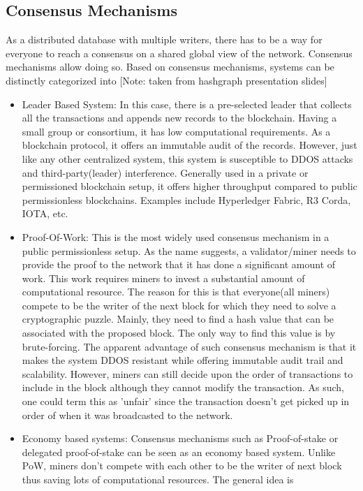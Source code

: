 \subsection{Consensus Mechanisms}
As a distributed database with multiple writers, there has to be a way for
everyone to reach a consensus on a shared global view of the network. Consensus
mechanisms allow doing so. Based on consensus mechanisms, systems can be
distinctly categorized into [Note: taken from hashgraph presentation slides]
\begin{itemize}
	\item Leader Based System: In this case, there is a pre-selected leader
		that collects all the transactions and appends new records to the
		blockchain.  Having a small group or consortium, it has low
		computational requirements. As a blockchain protocol, it offers an
		immutable audit of the records. However, just like any other
		centralized system, this system is susceptible to DDOS attacks and
		third-party(leader) interference. Generally used in a private or
		permissioned blockchain setup, it offers higher throughput compared to
		public permissionless blockchains. Examples include Hyperledger Fabric,
		R3 Corda, IOTA, etc. 
	\item Proof-Of-Work: This is the most widely used consensus mechanism in a
		public permissionless setup. As the name suggests, a validator/miner
		needs to provide the proof to the network that it has done a
		significant amount of work. This work requires miners to invest a
		substantial amount of computational resource. The reason for this is
		that everyone(all miners) compete to be the writer of the next block
		for which they need to solve a cryptographic puzzle. Mainly, they need
		to find a hash value that can be associated with the proposed block.
		The only way to find this value is by brute-forcing. The apparent
		advantage of such consensus mechanism is that it makes the system DDOS
		resistant while offering immutable audit trail and scalability.
		However, miners can still decide upon the order of transactions to
		include in the block although they cannot modify the transaction. As
		such, one could term this as 'unfair' since the transaction doesn't get
		picked up in order of when it was broadcasted to the network. 
	\item Economy based systems: Consensus mechanisms such as Proof-of-stake or
		delegated proof-of-stake can be seen as an economy based system. Unlike
		PoW, miners don't compete with each other to be the writer of next
		block thus saving lots of computational resources. The general idea is

\end{itemize}
